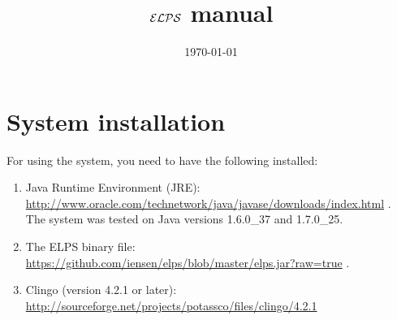 \documentclass[12pt, letterpaper]{article}
\begin{document}
\newcommand{\hide}[1]{}
\newcommand{\exercise}[1]{}
\newcommand{\future}[1]{}
\newcommand{\otherquestions}[1]{}
\newcommand{\set}[1]{\{#1\}}
\newcommand{\pg}[1]{{\tt #1}}
\newtheorem{definition}{Definition}
\newcommand{\emptyclause}{\Box}
\def\st{\bigskip\noindent}
\newcommand{\lplus}
{
   \stackrel{+}{\gets}
}

\newcommand{\fe}[1] {
  \begin{frame}
    #1
  \end{frame}}

\newcommand{\eoa}{ {\bf End} of algorithm}

\newcommand{\ft}[1] {\frametitle{#1}}

\newcommand{\ie}[1] {
  \begin{itemize}
    #1
  \end{itemize}
}

\newcommand{\ee}[1] {
  \begin{enumerate}
    #1
  \end{enumerate}\label{marker}
}
\newcommand{\blk}[2] {
  \begin{block}{#1}
    #2
  \end{block}
}

\newtheorem{collorary}{Corollary}
\newtheorem{proposition}{Proposition}
\newtheorem{invariant}{Invariant}
\newtheorem{property}{Property}
\newtheorem{claim}{Claim}
\newtheorem{example}{Example}


\title{${\cal ELPS}$ manual}
\date{\today}
\maketitle
\tableofcontents
\pagebreak


\section{System installation}

\st For using the system, you need to have the following installed:
\begin{enumerate}
\item Java Runtime Environment (JRE): \\
{\scriptsize
\url{http://www.oracle.com/technetwork/java/javase/downloads/index.html}
}.\\
The system was tested on Java versions 1.6.0\_37 and 1.7.0\_25.
\item The ELPS binary file: \\ 
{\scriptsize
\url{https://github.com/iensen/elps/blob/master/elps.jar?raw=true}
}.

\item Clingo (version 4.2.1 or later):\\ {\scriptsize
 \url{http://sourceforge.net/projects/potassco/files/clingo/4.2.1}}


\end{enumerate}
\end{document}
